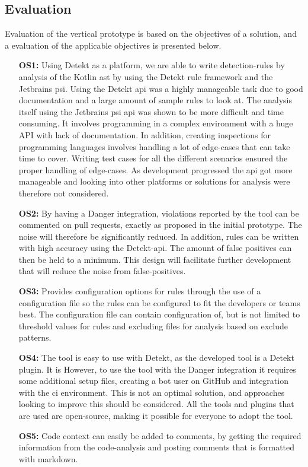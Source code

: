 \documentclass{report}
\begin{document}
\subsection*{Evaluation}
Evaluation of the vertical prototype is based on the objectives of a solution, and a evaluation of the applicable objectives is presented below.
\begin{itemize}
    \item [\textbf{OS1:}] Using Detekt as a platform, we are able to write detection-rules by analysis of the Kotlin \gls{ast} by using the Detekt rule framework and the  Jetbrains \gls{psi}. Using the Detekt \gls{api} was a highly manageable task due to good documentation and a large amount of sample rules to look at. The analysis itself using the Jetbrains \gls{psi} \gls{api} was shown to be more difficult and time consuming. It involves programming in a complex environment with a huge API with lack of documentation. In addition, creating inspections for programming languages involves handling a lot of edge-cases that can take time to cover. Writing test cases for all the different scenarios ensured the proper handling of edge-cases. As development progressed the \gls{api} got more manageable and looking into other platforms or solutions for analysis were therefore not considered. \label{vertical-os1}
    
    \item [\textbf{OS2:}] By having a Danger integration, violations reported by the tool can be commented on pull requests, exactly as proposed in the initial prototype. The noise will therefore be significantly reduced. In addition, rules can be written with high accuracy using the Detekt-api.  The amount of false positives can then be held to a minimum. This design will facilitate further development that will reduce the noise from false-positives. 
    
    \item [\textbf{OS3:}] Provides configuration options for rules through the use of a configuration file so the rules can be configured to fit the developers or teams best. The configuration file can contain configuration of, but is not limited to threshold values for rules and excluding files for analysis based on exclude patterns. \label{vertical-os3}
    
    \item [\textbf{OS4:}] The tool is easy to use with Detekt, as the developed tool is a Detekt plugin. It is However, to use the tool with the Danger integration it requires some additional setup files, creating a bot user on GitHub and integration with the \gls{ci} environment. This is not an optimal solution, and approaches looking to improve this should be considered. All the tools and plugins that are used are open-source, making it possible for everyone to adopt the tool. \label{vertical-os4}
    
    \item [\textbf{OS5:}] Code context can easily be added to comments, by getting the required information from the code-analysis and posting comments that is formatted with markdown. \label{vertical-os5}

\end{itemize}
\end{document}
